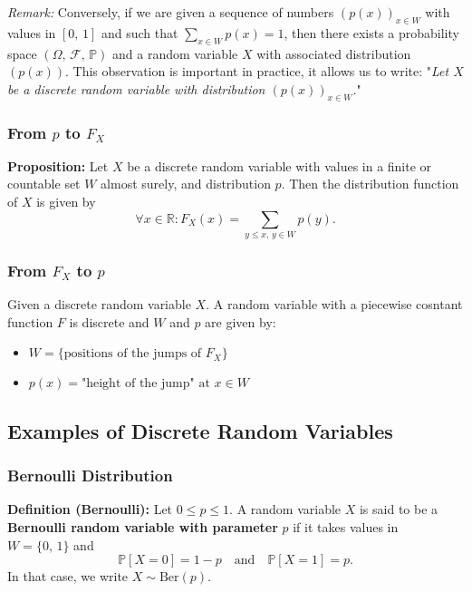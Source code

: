 \documentclass[a4paper]{extarticle}
\begin{document}
\textit{Remark:} Conversely, if we are given a sequence of numbers \((p(x))_{x \in W}\) with values in \([0, \, 1]\) and such that \(\sum_{x \in W} p(x) = 1\), then there exists a probability space \((\Omega, \, \mathcal{F}, \, \mathbb{P})\) and a random variable \(X\) with associated distribution \((p(x))\). This observation is important in practice, it allows us to write: "\textit{Let \(X\) be a discrete random variable with distribution \((p(x))_{x \in W}\).}"

\subsubsection{From \(p\) to \(F_X\)}

\begin{cbox}
    \textbf{Proposition:} Let \(X\) be a discrete random variable with values in a finite or countable set \(W\) almost surely, and distribution \(p\). Then the distribution function of \(X\) is given by
    \[
        \forall x \in \mathbb{R} : F_X(x) = \sum_{y \leq x, \,y \in W} p(y).
    \]
\end{cbox}

\subsubsection{From \(F_X\) to \(p\)}

Given a discrete random variable \(X\). A random variable with a piecewise cosntant function \(F\) is discrete and \(W\) and \(p\) are given by:

\begin{itemize}
    \item \(W = \{\text{positions of the jumps of } F_X\}\)
    \item \(p(x) = \text{"height of the jump" at } x \in W\)
\end{itemize}

\subsection{Examples of Discrete Random Variables}

\subsubsection{Bernoulli Distribution}

\textbf{Definition (Bernoulli):} Let \(0 \leq p \leq 1\). A random variable \(X\) is said to be a \textbf{Bernoulli random variable with parameter} \(p\) if it takes values in \(W = \{0, \, 1\}\) and
\[
    \mathbb{P}[X = 0] = 1 - p \quad \text{and} \quad \mathbb{P}[X = 1] = p.
\]
In that case, we write \(X \sim \text{Ber}(p)\).
\end{document}
